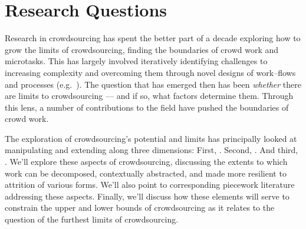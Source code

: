 \documentclass[trackingWork]{subfiles}
\begin{document}
\section{Research Questions}

{Research in crowdsourcing has spent the better part of a decade
exploring how to grow the limits of crowdsourcing,
finding the boundaries of crowd work and microtasks.}
This has largely involved iteratively
  identifying challenges to increasing complexity and
  overcoming them through novel designs of work--flows and processes (e.g.~\cite{bernsteinSoylent,foundry,crowdForgeKittur}).
The question that has emerged then
has been \textit{whether} there are limits to crowdsourcing
--- and if so, what factors determine them.
Through this lens,
a number of contributions to the field have pushed the boundaries of crowd work.

The exploration of crowdsourcing's potential and limits has principally looked at
manipulating and extending along three dimensions:
First, .
Second, .
And third, .
We'll explore these aspects of crowdsourcing,  discussing the extents to which work can be
decomposed,  contextually abstracted, and
made more resilient to attrition of various forms.
We'll also point to corresponding piecework literature addressing these aspects.
Finally, we'll discuss how these elements will serve
to constrain the upper and lower bounds of crowdsourcing as it relates
to the question of the furthest limits of crowdsourcing.







\onlyinsubfile{
  \printbibliography{}
}
\end{document}

